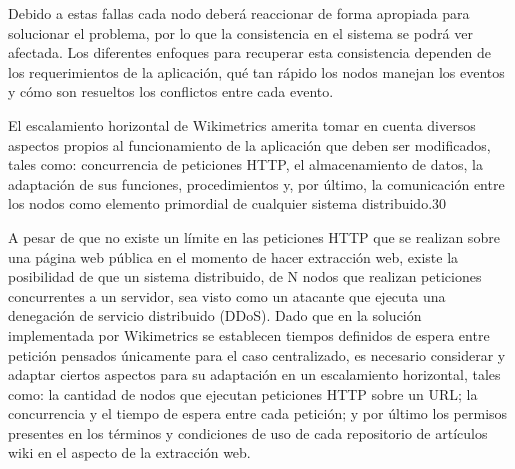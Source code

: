 Debido a estas fallas cada nodo deberá reaccionar de forma apropiada para
solucionar el problema, por lo que la consistencia en el sistema se podrá ver afectada.
Los diferentes enfoques para recuperar esta consistencia dependen de los
requerimientos de la aplicación, qué tan rápido los nodos manejan los eventos y cómo
son resueltos los conflictos entre cada evento.

El escalamiento horizontal de Wikimetrics amerita tomar en cuenta diversos
aspectos propios al funcionamiento de la aplicación que deben ser modificados, tales
como: concurrencia de peticiones HTTP, el almacenamiento de datos, la adaptación de
sus funciones, procedimientos y, por último, la comunicación entre los nodos como
elemento primordial de cualquier sistema distribuido.30

A pesar de que no existe un límite en las peticiones HTTP que se realizan sobre una
página web pública en el momento de hacer extracción web, existe la posibilidad de que
un sistema distribuido, de N nodos que realizan peticiones concurrentes a un servidor,
sea visto como un atacante que ejecuta una denegación de servicio distribuido (DDoS).
Dado que en la solución implementada por Wikimetrics se establecen tiempos definidos
de espera entre petición pensados únicamente para el caso centralizado, es necesario
considerar y adaptar ciertos aspectos para su adaptación en un escalamiento horizontal,
tales como: la cantidad de nodos que ejecutan peticiones HTTP sobre un URL; la
concurrencia y el tiempo de espera entre cada petición; y por último los permisos
presentes en los términos y condiciones de uso de cada repositorio de artículos wiki en
el aspecto de la extracción web.

